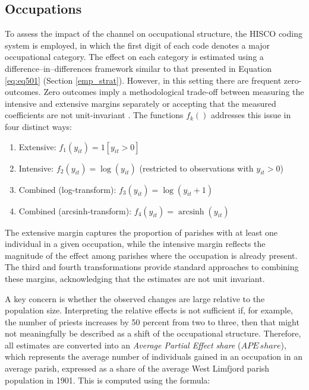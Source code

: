 \documentclass[12pt]{article}
\begin{document}
\subsection{Occupations}

To assess the impact of the channel on occupational structure, the HISCO coding system \citep{leeuwen2002hisco} is employed, in which the first digit of each code denotes a major occupational category. The effect on each category is estimated using a difference–in–differences framework similar to that presented in Equation \ref{eq:eq501} (Section \ref{emp_strat}). However, in this setting there are frequent zero-outcomes. Zero outcomes imply a methodological trade-off between measuring the intensive and extensive margins separately or accepting that the measured coefficients are not unit-invariant \citep{roth2023loglike}. The functions $f_k()$ addresses this issue in four distinct ways:
\begin{enumerate}
    \item Extensive: $f_1(y_{it}) = 1[y_{it}>0]$
    \item Intensive: $f_2(y_{it}) = \log(y_{it})$ (restricted to observations with $y_{it}>0$)
    \item Combined (log-transform): $f_3(y_{it}) = \log(y_{it}+1)$
    \item Combined (arcsinh-transform): $f_4(y_{it}) = \operatorname{arcsinh}(y_{it})$
\end{enumerate}

The extensive margin captures the proportion of parishes with at least one individual in a given occupation, while the intensive margin reflects the magnitude of the effect among parishes where the occupation is already present. The third and fourth transformations provide standard approaches to combining these margins, acknowledging that the estimates are not unit invariant.

A key concern is whether the observed changes are large relative to the population size. Interpreting the relative effects is not sufficient if, for example, the number of priests increases by 50 percent from two to three, then that might not meaningfully be described as a shift of the occupational structure. Therefore, all estimates are converted into an \textit{Average Partial Effect share} ($APE\,share$), which represents the average number of individuals gained in an occupation in an average parish, expressed as a share of the average West Limfjord parish population in 1901. This is computed using the formula:
\end{document}
